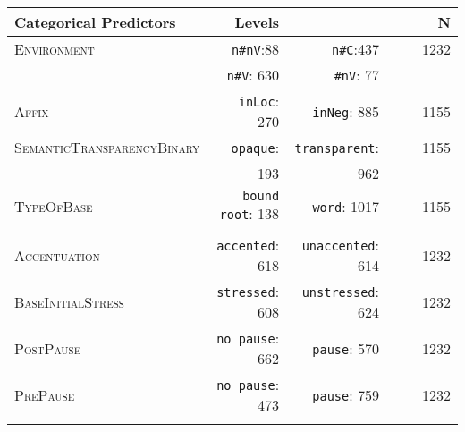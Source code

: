 \begin{table}
{\begin{tabular}{lrrrrr}
				\midrule
				Categorical Predictors & Levels &   &  & &N  \\ 
				\midrule
				\textsc{Environment}       & \texttt{n\#nV}:88  &   \texttt{n\#C}:437   & && 1232\\ 
				& \texttt{n\#V}: 630  & \texttt{\#nV}: 77  &&& \\ 		
				\textsc{Affix}        &\texttt{inLoc}: 270 & \texttt{inNeg}: 885 & &&1155 \\ 	
				\textsc{SemanticTransparencyBinary}        & \texttt{opaque}: & \texttt{transparent}: && & 1155\\ 
				& 193& 962&& & \\ 
				\textsc{TypeOfBase}        &\texttt{bound root}: 138& \texttt{word}: 1017& &&  1155\\ 	
				&& & && \\ 			
				\textsc{Accentuation}       &\texttt{accented}: 618 & \texttt{unaccented}: 614 & && 1232 \\ 
				\textsc{BaseInitialStress}       &\texttt{stressed}: 608 & \texttt{unstressed}: 624 & & & 1232\\ 		
				\textsc{PostPause}       &\texttt{no pause}: 662 & \texttt{pause}: 570 & && 1232 \\ 
				\textsc{PrePause}       &\texttt{no pause}: 473 & \texttt{pause}: 759 & & & 1232\\ 
				\lspbottomrule 
			\end{tabular}
		}
	

\end{table}



